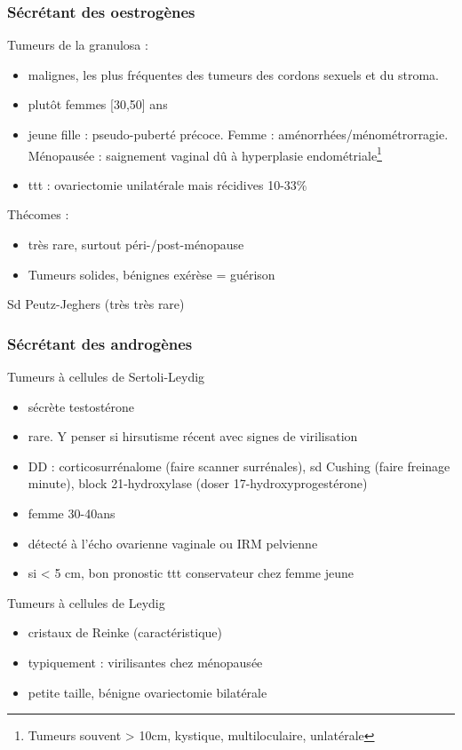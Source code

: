 \documentclass[11pt]{article}
\begin{document}
\subsubsection{Sécrétant des oestrogènes}
\label{sec:org2ff0d57}
Tumeurs de la granulosa : 
\begin{itemize}
\item malignes, les plus fréquentes des tumeurs des cordons sexuels et du stroma.
\item plutôt femmes [30,50] ans
\item jeune fille : pseudo-puberté précoce. Femme :
aménorrhées/ménométrorragie. Ménopausée : saignement vaginal dû à hyperplasie
endométriale\footnote{Tumeurs souvent > 10cm, kystique, multiloculaire, unlatérale}
\item ttt : ovariectomie unilatérale mais récidives 10-33\%
\end{itemize}

Thécomes : 
\begin{itemize}
\item très rare, surtout péri-/post-ménopause
\item Tumeurs solides, bénignes \thus exérèse = guérison
\end{itemize}
Sd Peutz-Jeghers (très très rare)

\subsubsection{Sécrétant des androgènes}
\label{sec:orgde58832}
Tumeurs à cellules de Sertoli-Leydig 
\begin{itemize}
\item sécrète testostérone
\item rare. Y penser si hirsutisme récent avec signes de virilisation
\item DD : corticosurrénalome (faire scanner surrénales), sd Cushing (faire freinage
minute), block 21-hydroxylase (doser 17-hydroxyprogestérone)
\item femme 30-40ans
\item détecté à l'écho ovarienne vaginale ou IRM pelvienne
\item si < 5 cm, bon pronostic \thus ttt conservateur chez femme jeune
\end{itemize}

Tumeurs à cellules de Leydig
\begin{itemize}
\item cristaux de Reinke (caractéristique)
\item typiquement : virilisantes chez ménopausée
\item petite taille, bénigne \thus ovariectomie bilatérale
\end{itemize}
\end{document}
